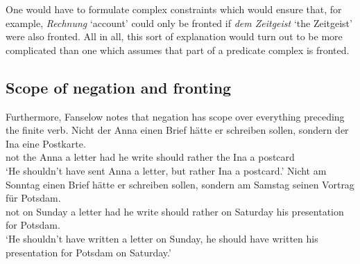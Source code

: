 \eal
{}
\zl
One would have to formulate complex constraints which would ensure that, for example,
\emph{Rechnung} `account' could
only be fronted if \emph{dem Zeitgeist} `the Zeitgeist' were also fronted. All in all, this sort of explanation would turn out
to be more complicated than one which assumes that part of a predicate complex is fronted.

\subsection{Scope of negation and fronting}

Furthermore, Fanselow notes that negation has scope over everything preceding 
the finite verb.
\eal
\ex  
\gll Nicht der Anna einen Brief hätte er schreiben sollen, sondern der Ina eine Postkarte.\\
     not the Anna a letter had he write should rather the Ina a postcard\\
\glt `He shouldn't have sent Anna a letter, but rather Ina a postcard.'
\ex 
\gll Nicht am Sonntag einen Brief hätte er schreiben sollen, sondern am Samstag seinen Vortrag für Potsdam.\\
     not on Sunday a letter had he write should rather on Saturday his presentation for Potsdam.\\
\glt `He shouldn't have written a letter on Sunday, he should have written his presentation for Potsdam on Saturday.'
\zl

